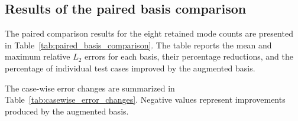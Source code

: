 \subsection{Results of the paired basis comparison}

The paired comparison results for the eight retained
mode counts are presented in
Table~\ref{tab:paired_basis_comparison}. The table reports
the mean and maximum relative $L_2$ errors for each basis,
their percentage reductions, and the percentage of
individual test cases improved by the augmented basis.

\begin{table}[htbp]
    \centering
    \caption{Paired comparison of original and augmented
    POD bases over 100 independent test cases.}
    \label{tab:paired_basis_comparison}
    \scriptsize
    \setlength{\tabcolsep}{3pt}
\end{table}

The case-wise error changes are summarized in
Table~\ref{tab:casewise_error_changes}. Negative values
represent improvements produced by the augmented basis.

